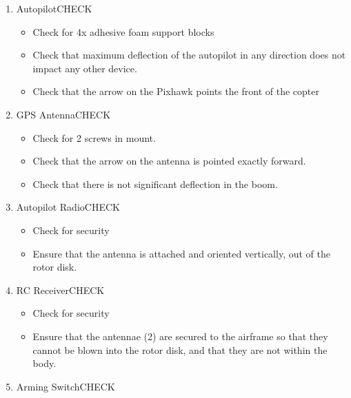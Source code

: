\documentclass{report}
\begin{document}
\begin{enumerate}
\begin{enumerate}
\begin{enumerate}
\begin{itemize}
								\end{itemize}
							\item 2x Battery Straps\hrulefill CHECK
								\begin{itemize}
									\item Check for presence
									\item Check for 40 cm length
								\end{itemize}
						\end{enumerate}
				\end{enumerate}
			\item Autopilot\hrulefill CHECK
				\begin{itemize}
					\item Check for 4x adhesive foam support blocks
					\item Check that maximum deflection of the autopilot in any direction does not impact any other device.
					\item Check that the arrow on the Pixhawk points the front of the copter
				\end{itemize}
			\item GPS Antenna\hrulefill CHECK
				\begin{itemize}
					\item Check for 2 screws in mount.
					\item Check that the arrow on the antenna is pointed exactly forward.
					\item Check that there is not significant deflection in the boom.
				\end{itemize}
			\item Autopilot Radio\hrulefill CHECK
				\begin{itemize}
					\item Check for security
					\item Ensure that the antenna is attached and oriented vertically, out of the rotor disk.
				\end{itemize}
			\item RC Receiver\hrulefill CHECK
				\begin{itemize}
					\item Check for security
					\item Ensure that the antennae (2) are secured to the airframe so that they cannot be blown into the rotor disk, and that they are not within the body.
				\end{itemize}
			\item Arming Switch\hrulefill CHECK
				\begin{itemize}

\end{itemize}
\end{enumerate}
\end{document}
